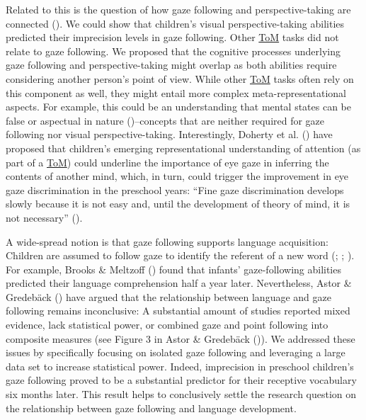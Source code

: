 \documentclass[
]{scrbook}
\begin{document}
Related to this is the question of how gaze following and perspective-taking are connected (). We could show that children's visual perspective-taking abilities predicted their imprecision levels in gaze following. Other \hyperref[acronyms_ToM]{ToM} tasks did not relate to gaze following. We proposed that the cognitive processes underlying gaze following and perspective-taking might overlap as both abilities require considering another person's point of view. While other \hyperref[acronyms_ToM]{ToM} tasks often rely on this component as well, they might entail more complex meta-representational aspects. For example, this could be an understanding that mental states can be false or aspectual in nature ()\thinspace --\thinspace concepts that are neither required for gaze following nor visual perspective-taking. Interestingly, Doherty et al. () have proposed that children's emerging representational understanding of attention (as part of a \hyperref[acronyms_ToM]{ToM}) could underline the importance of eye gaze in inferring the contents of another mind, which, in turn, could trigger the improvement in eye gaze discrimination in the preschool years: ``Fine gaze discrimination develops slowly because it is not easy and, until the development of theory of mind, it is not necessary'' ().

A wide-spread notion is that gaze following supports language acquisition: Children are assumed to follow gaze to identify the referent of a new word (; ; ). For example, Brooks \& Meltzoff () found that infants' gaze-following abilities predicted their language comprehension half a year later. Nevertheless, Astor \& Gredebäck () have argued that the relationship between language and gaze following remains inconclusive: A substantial amount of studies reported mixed evidence, lack statistical power, or combined gaze and point following into composite measures (see Figure 3 in Astor \& Gredebäck ()). We addressed these issues by specifically focusing on isolated gaze following and leveraging a large data set to increase statistical power. Indeed, imprecision in preschool children's gaze following proved to be a substantial predictor for their receptive vocabulary six months later. This result helps to conclusively settle the research question on the relationship between gaze following and language development.
\end{document}
